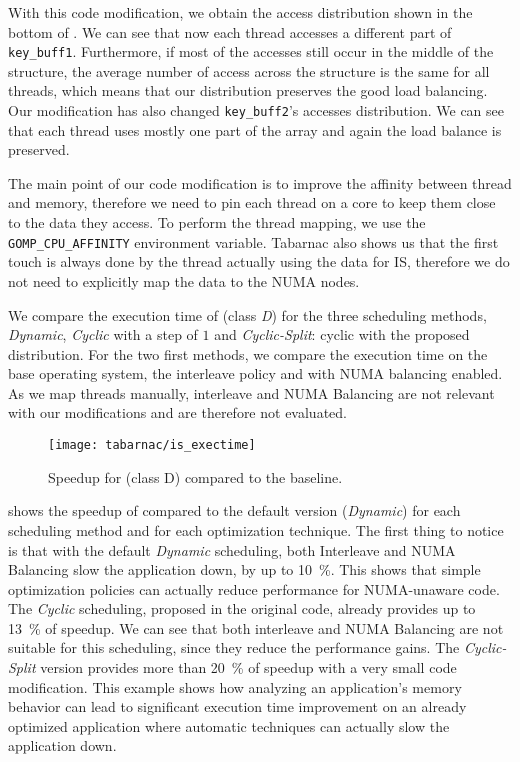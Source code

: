 With this code modification, we obtain the access distribution shown in the bottom of .
We can see that now each thread accesses a different part of \texttt{key\_buff1}.
Furthermore, if most of the accesses still occur in the middle of the structure, the average number of access across the structure is the same for all threads, which means that our distribution preserves the good load balancing.
Our modification has also changed \texttt{key\_buff2}'s accesses distribution.
We can see that each thread uses mostly one part of the array and again the load balance is preserved.

The main point of our code modification is to improve the affinity between thread and memory, therefore we need to pin each thread on a core to keep them close to the data they access.
To perform the thread mapping, we use the \texttt{GOMP\_CPU\_AFFINITY} environment variable.
\gls{Tabarnac} also shows us that the first touch is always done by the thread actually using the data for IS, therefore we do not need to explicitly map the data to the \gls{NUMA} nodes.

We compare the execution time of \IS (class \emph{D}) for the three scheduling methods, \emph{Dynamic}, \emph{Cyclic} with a step of $1$ and \emph{Cyclic-Split}: cyclic with the proposed distribution.
For the two first methods, we compare the execution time on the base operating system, the interleave policy and with \gls{NUMA} balancing enabled.
As we map threads manually, interleave and \gls{NUMA} Balancing are not relevant with our modifications and are therefore not evaluated.

\begin{figure}[htb]
    \centering
    \texttt{[image: tabarnac/is\_exectime]}
    \caption{Speedup for \IS (class D) compared to the baseline.}
\label{fig:is-res}
\end{figure}

 shows the speedup of \IS compared to the default version (\emph{Dynamic}) for each scheduling method and for each optimization technique.
The first thing to notice is that with the default \emph{Dynamic} scheduling, both Interleave and \gls{NUMA} Balancing slow the application down, by up to \SI{10}{\%}.
This shows that simple optimization policies can actually reduce performance for \gls{NUMA}-unaware code.
The \emph{Cyclic} scheduling, proposed in the original code, already provides up to \SI{13}{\%} of speedup.
We can see that both interleave and \gls{NUMA} Balancing are not suitable for this scheduling, since they reduce the performance gains.
The \emph{Cyclic-Split} version provides more than \SI{20}{\%} of speedup with a very small code modification.
This example shows how analyzing an application's memory behavior can lead to significant execution time improvement on an already optimized application where automatic techniques can actually slow the application down.

